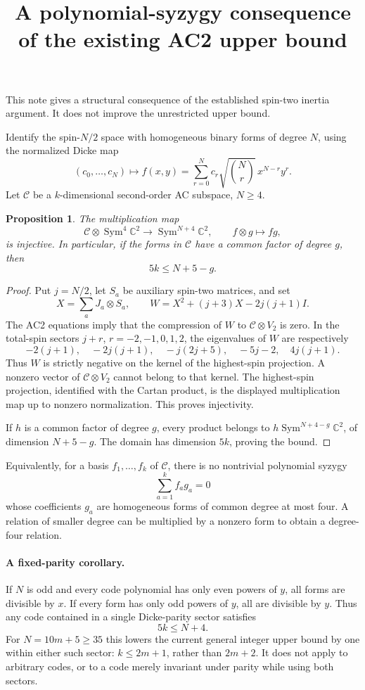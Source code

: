 \documentclass[11pt]{article}
\newtheorem{proposition}{Proposition}
\begin{document}
\title{A polynomial-syzygy consequence of the existing AC2 upper bound}
\author{}\date{}\maketitle
This note gives a structural consequence of the established spin-two
inertia argument. It does not improve the unrestricted upper bound.

Identify the spin-$N/2$ space with homogeneous binary forms of degree $N$,
using the normalized Dicke map
\[
 (c_0,\ldots,c_N)\longmapsto
 f(x,y)=\sum_{r=0}^N c_r\sqrt{\binom Nr}\,x^{N-r}y^r.
\]
Let $\mathcal C$ be a $k$-dimensional second-order AC subspace, $N\ge4$.
\begin{proposition}
The multiplication map
\[
 \mathcal C\otimes\operatorname{Sym}^4\mathbb C^2
 \longrightarrow\operatorname{Sym}^{N+4}\mathbb C^2,
 \qquad f\otimes g\longmapsto fg,
\]
is injective. In particular, if the forms in $\mathcal C$ have a common
factor of degree $g$, then
\[
 \boxed{5k\le N+5-g.}
\]
\end{proposition}
\begin{proof}
Put $j=N/2$, let $S_a$ be auxiliary spin-two matrices, and set
\[
 X=\sum_aJ_a\otimes S_a,\qquad
 W=X^2+(j+3)X-2j(j+1)I.
\]
The AC2 equations imply that the compression of $W$ to
$\mathcal C\otimes V_2$ is zero. In the total-spin sectors $j+r$,
$r=-2,-1,0,1,2$, the eigenvalues of $W$ are respectively
\[
 -2(j+1),\quad -2j(j+1),\quad -j(2j+5),\quad -5j-2,
 \quad4j(j+1).
\]
Thus $W$ is strictly negative on the kernel of the highest-spin
projection. A nonzero vector of $\mathcal C\otimes V_2$ cannot belong
to that kernel. The highest-spin projection, identified with the Cartan
product, is the displayed multiplication map up to nonzero normalization.
This proves injectivity.

If $h$ is a common factor of degree $g$, every product belongs to
$h\operatorname{Sym}^{N+4-g}\mathbb C^2$, of dimension $N+5-g$.
The domain has dimension $5k$, proving the bound.
\end{proof}
Equivalently, for a basis $f_1,\ldots,f_k$ of $\mathcal C$, there is no
nontrivial polynomial syzygy
\[
 \sum_{a=1}^k f_a g_a=0
\]
whose coefficients $g_a$ are homogeneous forms of common degree at most
four. A relation of smaller degree can be multiplied by a nonzero form
to obtain a degree-four relation.

\paragraph{A fixed-parity corollary.}
If $N$ is odd and every code polynomial has only even powers of $y$,
all forms are divisible by $x$. If every form has only odd powers of
$y$, all are divisible by $y$. Thus any code contained in a single
Dicke-parity sector satisfies
\[
 5k\le N+4.
\]
For $N=10m+5\ge35$ this lowers the current general integer upper bound
by one within either such sector: $k\le2m+1$, rather than $2m+2$.
It does not apply to arbitrary codes, or to a code merely invariant under
parity while using both sectors.
\end{document}
